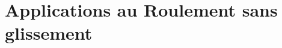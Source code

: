 %
% 
%

\newpage
\newcommand{\exer}{\subsection*}
\collefalse
\chapter*{Applications au Roulement sans glissement}

%

\graphicspath{{\repStyle/png}{\repRel/PSI_ExercicesCompetences/CIN/CIN-02-VitesseAcceleration/46_RR_RSG/images}}


